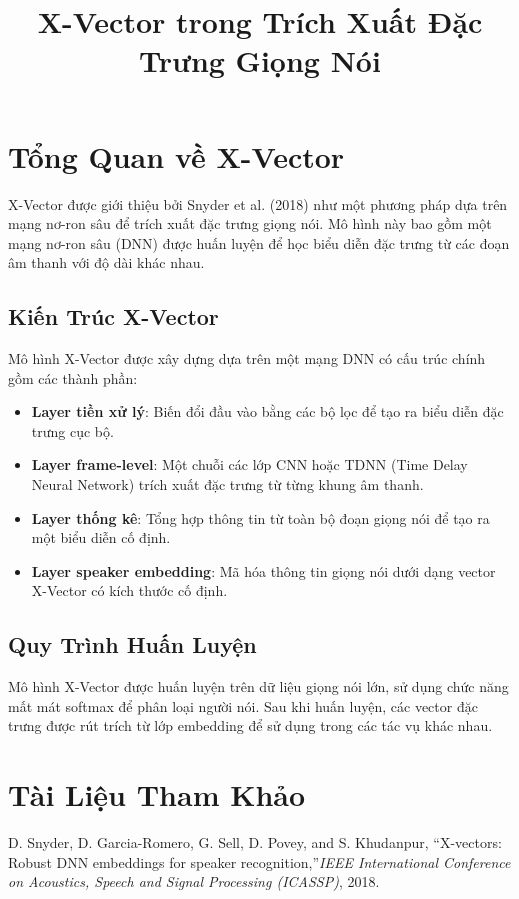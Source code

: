 \documentclass{article}
\begin{document}
\title{X-Vector trong Trích Xuất Đặc Trưng Giọng Nói}
\author{}
\date{}
\maketitle

\section{Tổng Quan về X-Vector}

X-Vector được giới thiệu bởi Snyder et al. (2018) như một phương pháp dựa trên mạng nơ-ron sâu để trích xuất đặc trưng giọng nói. Mô hình này bao gồm một mạng nơ-ron sâu (DNN) được huấn luyện để học biểu diễn đặc trưng từ các đoạn âm thanh với độ dài khác nhau.

\subsection{Kiến Trúc X-Vector}

Mô hình X-Vector được xây dựng dựa trên một mạng DNN có cấu trúc chính gồm các thành phần:

\begin{itemize}
    \item \textbf{Layer tiền xử lý}: Biến đổi đầu vào bằng các bộ lọc để tạo ra biểu diễn đặc trưng cục bộ.
    \item \textbf{Layer frame-level}: Một chuỗi các lớp CNN hoặc TDNN (Time Delay Neural Network) trích xuất đặc trưng từ từng khung âm thanh.
    \item \textbf{Layer thống kê}: Tổng hợp thông tin từ toàn bộ đoạn giọng nói để tạo ra một biểu diễn cố định.
    \item \textbf{Layer speaker embedding}: Mã hóa thông tin giọng nói dưới dạng vector X-Vector có kích thước cố định.
\end{itemize}

\subsection{Quy Trình Huấn Luyện}

Mô hình X-Vector được huấn luyện trên dữ liệu giọng nói lớn, sử dụng chức năng mất mát softmax để phân loại người nói. Sau khi huấn luyện, các vector đặc trưng được rút trích từ lớp embedding để sử dụng trong các tác vụ khác nhau.

\section{Tài Liệu Tham Khảo}

\begin{thebibliography}{9}
     D. Snyder, D. Garcia-Romero, G. Sell, D. Povey, and S. Khudanpur, \textquotedblleft X-vectors: Robust DNN embeddings for speaker recognition,\textquotedblright \emph{IEEE International Conference on Acoustics, Speech and Signal Processing (ICASSP)}, 2018.
\end{thebibliography}
\end{document}
